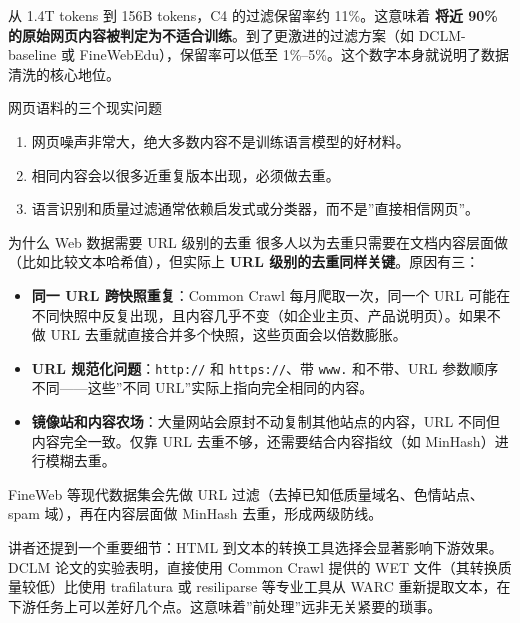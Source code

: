 从 1.4T tokens 到 156B tokens，C4 的过滤保留率约 11\%。这意味着 \textbf{将近 90\% 的原始网页内容被判定为不适合训练}。到了更激进的过滤方案（如 DCLM-baseline 或 FineWebEdu），保留率可以低至 1\%--5\%。这个数字本身就说明了数据清洗的核心地位。

\begin{knowledgebox}{网页语料的三个现实问题}
\begin{enumerate}
    \item 网页噪声非常大，绝大多数内容不是训练语言模型的好材料。
    \item 相同内容会以很多近重复版本出现，必须做去重。
    \item 语言识别和质量过滤通常依赖启发式或分类器，而不是”直接相信网页”。
\end{enumerate}
\end{knowledgebox}

\begin{knowledgebox}{为什么 Web 数据需要 URL 级别的去重}
很多人以为去重只需要在文档内容层面做（比如比较文本哈希值），但实际上 \textbf{URL 级别的去重同样关键}。原因有三：
\begin{itemize}
    \item \textbf{同一 URL 跨快照重复}：Common Crawl 每月爬取一次，同一个 URL 可能在不同快照中反复出现，且内容几乎不变（如企业主页、产品说明页）。如果不做 URL 去重就直接合并多个快照，这些页面会以倍数膨胀。
    \item \textbf{URL 规范化问题}：\texttt{http://} 和 \texttt{https://}、带 \texttt{www.} 和不带、URL 参数顺序不同——这些”不同 URL”实际上指向完全相同的内容。
    \item \textbf{镜像站和内容农场}：大量网站会原封不动复制其他站点的内容，URL 不同但内容完全一致。仅靠 URL 去重不够，还需要结合内容指纹（如 MinHash）进行模糊去重。
\end{itemize}
FineWeb 等现代数据集会先做 URL 过滤（去掉已知低质量域名、色情站点、spam 域），再在内容层面做 MinHash 去重，形成两级防线。
\end{knowledgebox}

讲者还提到一个重要细节：HTML 到文本的转换工具选择会显著影响下游效果。DCLM 论文的实验表明，直接使用 Common Crawl 提供的 WET 文件（其转换质量较低）比使用 trafilatura 或 resiliparse 等专业工具从 WARC 重新提取文本，在下游任务上可以差好几个点。这意味着”前处理”远非无关紧要的琐事。

